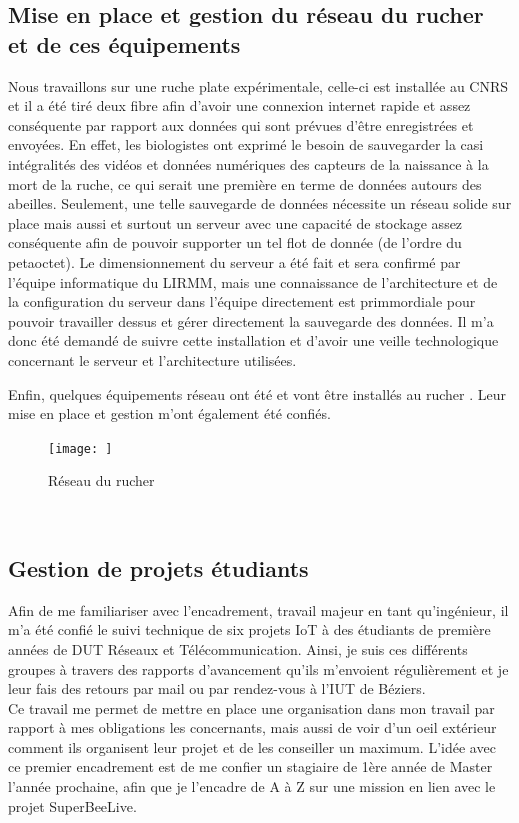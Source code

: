 \documentclass[11pt,french,a4paper]{report}
\begin{document}
{\subsection{Mise en place et gestion du réseau du rucher et de ces équipements}
Nous travaillons sur une ruche plate expérimentale, celle-ci est installée au CNRS et il a été tiré deux fibre afin d'avoir 
une connexion internet rapide et assez conséquente par rapport aux données qui sont prévues d'être enregistrées et envoyées. 
En effet, les biologistes ont exprimé le besoin de sauvegarder la casi intégralités des vidéos et données numériques des capteurs
de la naissance à la mort de la ruche, ce qui serait une première en terme de données autours des abeilles. Seulement, 
une telle sauvegarde de données nécessite un réseau solide sur place mais aussi et surtout un serveur avec une capacité 
de stockage assez conséquente afin de pouvoir supporter un tel flot de donnée (de l'ordre du petaoctet). 
Le dimensionnement du serveur a été fait et sera confirmé par l'équipe informatique du LIRMM, mais une connaissance 
de l'architecture et de la configuration du serveur dans l'équipe directement est primmordiale pour pouvoir travailler dessus
et gérer directement la sauvegarde des données. 
Il m'a donc été demandé de suivre cette installation et d'avoir une veille technologique concernant le serveur et l'architecture
utilisées. 

Enfin, quelques équipements réseau ont été et vont être installés au rucher . 
Leur mise en place et gestion m'ont également été confiés.

\begin{figure}
    \centering
    \texttt{[image: ]}
    \caption{Réseau du rucher}
    \label{reseau_rucher}
\end{figure} 


\subsection{Gestion de projets étudiants}
Afin de me familiariser avec l'encadrement, travail majeur en tant qu'ingénieur, il m'a été confié le suivi technique de six projets IoT 
à des étudiants de première années de DUT Réseaux et Télécommunication. Ainsi, je suis ces différents groupes à travers des rapports 
d'avancement qu'ils m'envoient régulièrement et je leur fais des retours par mail ou par rendez-vous à l'IUT de Béziers. \\
Ce travail me permet de mettre en place une organisation dans mon travail par rapport à mes obligations les concernants, mais aussi
de voir d'un oeil extérieur comment ils organisent leur projet et de les conseiller un maximum. 
L'idée avec ce premier encadrement est de me confier un stagiaire de 1ère année de Master l'année prochaine, afin que je l'encadre de A à Z 
sur une mission en lien avec le projet SuperBeeLive. 


}
\end{document}
